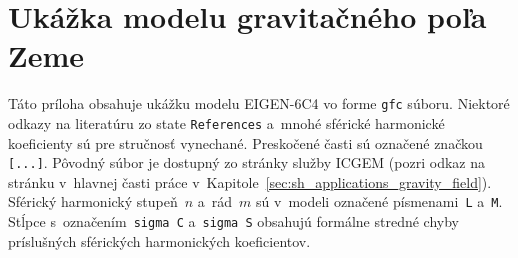 \documentclass[a4paper,12pt]{book}
\begin{document}
\chapter{Ukážka modelu gravitačného poľa Zeme}
\label{app:gfc_file}

Táto príloha obsahuje ukážku modelu EIGEN-6C4 vo forme \texttt{gfc} súboru.  
Niektoré odkazy na literatúru zo state \texttt{References} a~mnohé sférické 
harmonické koeficienty sú pre stručnosť vynechané.  Preskočené časti sú 
označené značkou \texttt{[...]}.  Pôvodný súbor je dostupný zo stránky služby 
ICGEM (pozri odkaz na stránku v~hlavnej časti práce 
v~Kapitole~\ref{sec:sh_applications_gravity_field}).  Sférický harmonický 
stupeň~$n$ a~rád~$m$ sú v~modeli označené písmenami~\texttt{L} a~\texttt{M}.  
Stĺpce s~označením~\texttt{sigma C} a~\texttt{sigma S} obsahujú formálne 
stredné chyby príslušných sférických harmonických koeficientov.

\vspace{10ex}
\end{document}
